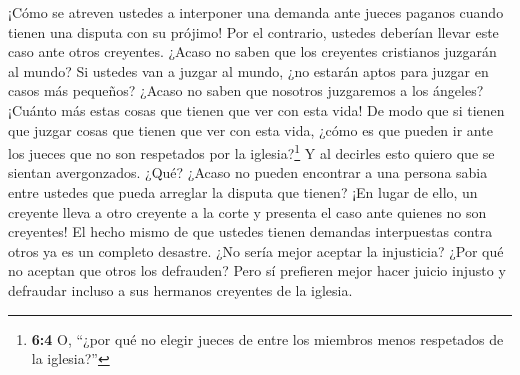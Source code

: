  ¡Cómo se atreven ustedes a interponer una demanda ante
jueces paganos cuando tienen una disputa con su prójimo! Por el
contrario, ustedes deberían llevar este caso ante otros creyentes.
 ¿Acaso no saben que los creyentes cristianos juzgarán al
mundo? Si ustedes van a juzgar al mundo, ¿no estarán aptos para juzgar
en casos más pequeños?  ¿Acaso no saben que nosotros
juzgaremos a los ángeles? ¡Cuánto más estas cosas que tienen que ver con
esta vida!  De modo que si tienen que juzgar cosas que
tienen que ver con esta vida, ¿cómo es que pueden ir ante los jueces que
no son respetados por la iglesia?\footnote{\textbf{6:4} O, ``¿por qué no
  elegir jueces de entre los miembros menos respetados de la iglesia?''}
 Y al decirles esto quiero que se sientan avergonzados.
¿Qué? ¿Acaso no pueden encontrar a una persona sabia entre ustedes que
pueda arreglar la disputa que tienen?  ¡En lugar de ello, un
creyente lleva a otro creyente a la corte y presenta el caso ante
quienes no son creyentes!  El hecho mismo de que ustedes
tienen demandas interpuestas contra otros ya es un completo desastre.
¿No sería mejor aceptar la injusticia? ¿Por qué no aceptan que otros los
defrauden?  Pero sí prefieren mejor hacer juicio injusto y
defraudar incluso a sus hermanos creyentes de la iglesia.


